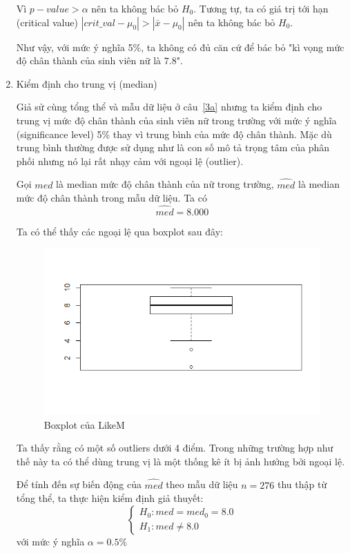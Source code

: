 \documentclass[a4paper,12pt]{article}
\begin{document}
\begin{enumerate}[label = \alph*)]
		Vì $p-value > \alpha$ nên ta không bác bỏ $H_0$. Tương tự, ta có giá trị tới hạn (critical value) $|crit\_val - \mu_0| > |\bar{x} - \mu_0|$ nên ta không bác bỏ $H_0$. 
		
		Như vậy, với mức ý nghĩa 5\%, ta không có đủ căn cứ để bác bỏ "kì vọng mức độ chân thành của sinh viên nữ là $7.8$".
	
		\item Kiểm định cho trung vị (median)
		
		Giả sử cùng tổng thể và mẫu dữ liệu ở câu~\ref{3a} nhưng ta kiểm định cho trung vị mức độ chân thành của sinh viên nữ trong trường với mức ý nghĩa (significance level) 5\% thay vì trung bình của mức độ chân thành. Mặc dù trung bình thường được sử dụng như là con số mô tả trọng tâm của phân phối nhưng nó lại rất nhạy cảm với ngoại lệ (outlier).
		
		Gọi $med$ là median mức độ chân thành của nữ trong trường, $\hat{med}$ là median mức độ chân thành trong mẫu dữ liệu. Ta có
		$$\hat{med} = 8.000$$
		
		Ta có thể thấy các ngoại lệ qua boxplot sau đây:
		\begin{figure}[H]
			\centering
			\includegraphics[width=0.7\linewidth]{Rplot3}
			\caption{Boxplot của LikeM}
			\label{fig:rplot3}
		\end{figure}
	
		Ta thấy rằng có một số outliers dưới 4 điểm. Trong những trường hợp như thế này ta có thể dùng trung vị là một thống kê ít bị ảnh hưởng bởi ngoại lệ.
		
		Để tính đến sự biến động của $\hat{med}$ theo mẫu dữ liệu $n = 276$ thu thập từ tổng thể, ta thực hiện kiểm định giả thuyết:
		\begin{equation*}
		\begin{cases}
		H_0: med = med_0 = 8.0\\
		H_1: med \neq 8.0
		\end{cases}
		\end{equation*}
		với mức ý nghĩa $\alpha = 0.5\%$
		

\end{enumerate}
\end{document}
